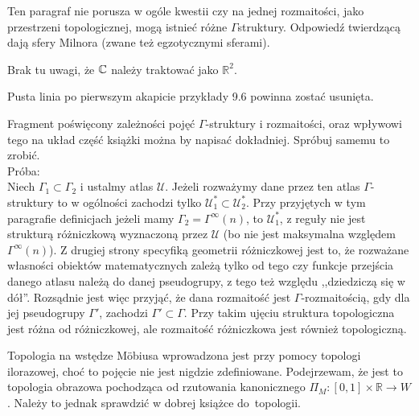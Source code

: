 \documentclass[a4paper,11pt]{article}
\begin{document}
\vspace{\spaceFour}


\start {} Ten paragraf nie porusza w ogóle kwestii czy na jednej
rozmaitości, jako przestrzeni topologicznej, mogą istnieć różne
$\Gamma$\dywiz struktury. Odpowiedź twierdzącą dają sfery Milnora
(zwane też egzotycznymi sferami).

\vspace{\spaceFour}


\start {} Brak tu uwagi, że $\mathbb{C}$ należy traktować jako
$\mathbb{R}^{ 2 }$.

\vspace{\spaceFour}


\start {} Pusta linia po pierwszym akapicie przykłady 9.6
powinna zostać usunięta.

\vspace{\spaceFour}


Fragment poświęcony zależności pojęć $\Gamma$-struktury i rozmaitości, oraz
wpływowi tego na układ część książki można by napisać dokładniej.
Spróbuj samemu to zrobić.
\\Próba:\\
Niech $\Gamma_{ 1 } \subset \Gamma_{ 2 }$ i ustalmy atlas
$\mathcal{ U }$. Jeżeli rozważymy dane przez ten atlas
$\Gamma$-struktury to w ogólności zachodzi tylko
$\mathcal{ U }^{ * }_{ 1 } \subset \mathcal{ U }^{ * }_{ 2 }$. Przy
przyjętych w tym paragrafie definicjach jeżeli mamy
$\Gamma_{ 2 } = \Gamma^{ \infty }( n )$, to
$\mathcal{ U }^{ * }_{ 1 }$, z reguły nie jest strukturą różniczkową
wyznaczoną przez $\mathcal{ U }$ (bo nie jest maksymalna względem
$\Gamma^{ \infty }( n )$). Z drugiej strony specyfiką geometrii
różniczkowej jest to, że rozważane własności obiektów matematycznych
zależą tylko od tego czy funkcje przejścia danego atlasu należą do
danej pseudogrupy, z tego też względu ,,dziedziczą się w dół''.
Rozsądnie jest więc przyjąć, że dana rozmaitość jest
$\Gamma$-rozmaitością, gdy dla jej pseudogrupy $\Gamma'$, zachodzi
$\Gamma' \subset \Gamma$. Przy takim ujęciu struktura topologiczna
jest różna od różniczkowej, ale rozmaitość różniczkowa
jest również topologiczną.\\

\vspace{\spaceFour}


\start {} Topologia na wstędze M\"obiusa wprowadzona jest przy
pomocy topologi ilorazowej, choć to pojęcie nie jest nigdzie
zdefiniowane. Podejrzewam, że jest to topologia obrazowa pochodząca od
rzutowania kanonicznego
$\Pi_{ M } : [ 0,1 ] \times \mathbb{ R } \to W$. Należy to jednak
sprawdzić w dobrej książce do~topologii.
\end{document}
